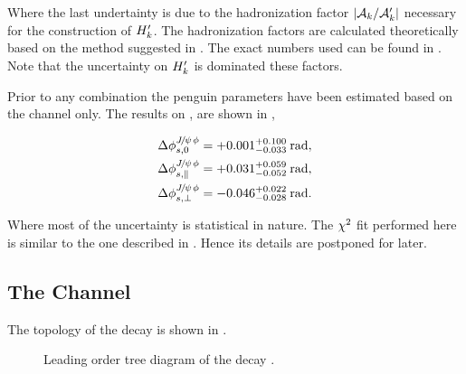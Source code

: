 \noindent Where the last undertainty is due to the hadronization factor $|\mathcal{A}_{k}/\mathcal{A}_{k}'|$ necessary for the construction of $H_{k}'$.
The hadronization factors are calculated theoretically based on the method suggested in \cite{eff-hamiltonian-bs-syst}.
The exact numbers used can be found in \cite{DeBruyn-thesis}. Note that the uncertainty on $H_{k}'$ is dominated these factors.


Prior to any combination the penguin parameters have been estimated based on the \BsJpsiKst channel only.
The results on \cite{bsjpsikst-paper}, are shown in ,

\begin{subequations}
  \label{delta_phis_jpsikst}
  \begin{align}
    \Delta\phi^{{J\mskip -3mu/\mskip -2mu\psi\mskip 2mu}\phi}_{s,{0}}         & = +0.001^{+0.100}_{-0.033} \:\text{rad},\\
    \Delta\phi^{{J\mskip -3mu/\mskip -2mu\psi\mskip 2mu}\phi}_{s,{\parallel}} & = +0.031^{+0.059}_{-0.052} \:\text{rad},\\
    \Delta\phi^{{J\mskip -3mu/\mskip -2mu\psi\mskip 2mu}\phi}_{s,{\perp}}     & = -0.046^{+0.022}_{-0.028} \:\text{rad}.
  \end{align}
\end{subequations}

\noindent Where most of the uncertainty is statistical in nature. The $\chi^2$ fit performed here is similar
to the one described in . Hence its details are postponed for later.


\subsection{The \BdJpsiRho Channel}
\label{bsjpsirho_chanell}

The topology of the \BdJpsiRho decay is shown in .

\begin{figure}[h]
  \centering
  \scalebox{0.9}{\sffamily }
  \caption{Leading order tree diagram of the decay \BdJpsiRho.}
  \label{bs2jpsirho_diagram}
\end{figure}


